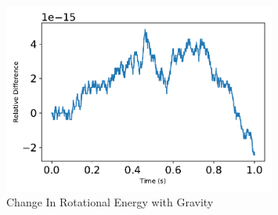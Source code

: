 \begin{figure}[htbp]\centerline{\includegraphics[width=0.8\textwidth]{AutoTeX/ChangeInRotationalEnergy2}}\caption{Change In Rotational Energy with Gravity}\label{fig:ChangeInRotationalEnergy2}\end{figure}